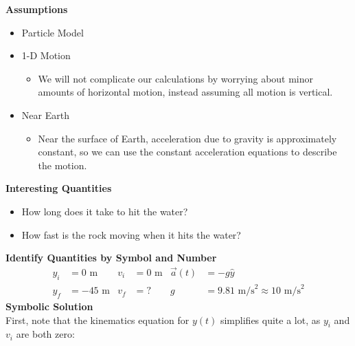 \documentclass[]{article}
\begin{document}
\newpage
\begin{TeacherMargin}
\noindent\textbf{Assumptions}
\begin{itemize}
	\item Particle Model
	\item 1-D Motion
	\begin{itemize}
		\item We will not complicate our calculations by worrying about minor amounts of horizontal motion, instead assuming all motion is vertical.
	\end{itemize}
	\item Near Earth
	\begin{itemize}
		\item Near the surface of Earth, acceleration due to gravity is approximately constant, so we can use the constant acceleration equations to describe the motion.
	\end{itemize}
\end{itemize}
\textbf{Interesting Quantities}
\begin{itemize}
	\item How long does it take to hit the water?
	\item How fast is the rock moving when it hits the water?
\end{itemize}
\begin{center}
\end{center}
\textbf{Identify Quantities by Symbol and Number}
\begin{align*}
	y_{i} & = 0\text{ m} & v_{i} & = 0\text{ m} & \vec{a}(t) & = -g\hat{y} \\
	y_{f} & = -45\text{ m} & v_{f} & = ? & g & = 9.81\text{ m/s}^{2} \approx 10\text{ m/s}^{2}
\end{align*}
\textbf{Symbolic Solution} \\
First, note that the kinematics equation for $y(t)$ simplifies quite a lot, as $y_{i}$ and $v_{i}$ are both zero:

\end{TeacherMargin}
\end{document}

